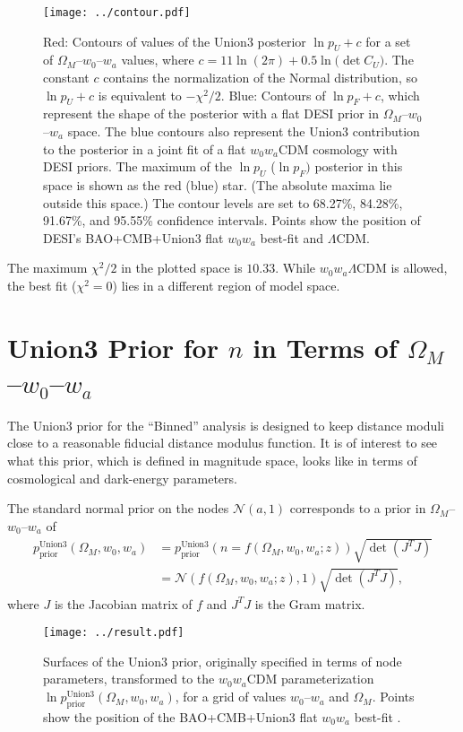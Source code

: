 \documentclass[11pt,a4paper]{article}
\begin{document}
\begin{figure}[htbp] %
   \centering
   \texttt{[image: ../contour.pdf]} 
   \caption{Red: Contours of values of the Union3 posterior $\ln{p_U}+c$ for a
set of $\Omega_M$--$w_0$--$w_a$ values, where $c= 11\ln{(2\pi)} + 0.5\ln({\det{C_U})}$.  The constant $c$ contains the
normalization of the Normal distribution, so $\ln{p_U}+c$  is equivalent to  $-\chi^2/2$.   
   Blue: Contours of  $\ln{p_F} +c  $, which represent the shape of the posterior with a flat DESI prior in  $\Omega_M$--$w_0$--$w_a$ space.   
   The blue contours  also represent the Union3 contribution to the posterior in a joint fit of a flat $w_0w_a$CDM cosmology with DESI priors.
   The maximum of the $\ln{p}_U$  ($\ln{p}_F)$ posterior in this space is shown as the red (blue) star.  (The absolute maxima
   lie outside this space.)
   The contour levels are set to 68.27\%, 84.28\%, 91.67\%, and 95.55\% confidence intervals. 
   Points show the position of DESI's  BAO+CMB+Union3 flat $w_0w_a$ best-fit 
    and  $\Lambda$CDM.}
   \label{fig:posterior}
\end{figure}

The maximum $\chi^2/2$ in the plotted space is $10.33$.  While $w_0w_a\Lambda$CDM is allowed, the best fit ($\chi^2=0$) lies in a
different region of model space. 

\section{Union3 Prior for $n$ in Terms of $\Omega_M$--$w_0$--$w_a$}
\label{sec:prior}
The Union3 prior for the ``Binned'' analysis is designed to keep distance moduli close to a reasonable
fiducial distance modulus function.  It is of interest to see what this prior, which is defined in magnitude
space, looks like in terms of cosmological and dark-energy parameters.

The standard normal prior on the nodes $\mathcal{N}(a,1)$ corresponds to a prior in  $\Omega_M$--$w_0$--$w_a$ of
\begin{align}
p^\text{Union3}_\text{prior}(\Omega_M, w_0,w_a)  & =p^\text{Union3}_\text{prior}(n=f(\Omega_M, w_0, w_a; z))  \sqrt{\det{\left(J^T J\right)}} \\
& = \mathcal{N}(f(\Omega_M, w_0, w_a; z),1)  \sqrt{\det{\left(J^T J\right)}},
\end{align}
where $J$ is the Jacobian matrix of $f$ and $J^TJ$ is the Gram matrix.

\begin{figure}[htbp] %
   \centering
   \texttt{[image: ../result.pdf]} 
   \caption{Surfaces of the Union3 prior, originally specified in terms of node parameters, transformed to the $w_0w_a$CDM parameterization
   $\ln{p^\text{Union3}_\text{prior}}(\Omega_M, w_0,w_a)$,  for a grid of values
 $w_0$--$w_a$ and $\Omega_M$.   
   Points show the position of the BAO+CMB+Union3 flat $w_0w_a$ best-fit .}
   \label{fig:priors}
\end{figure}
\end{document}
